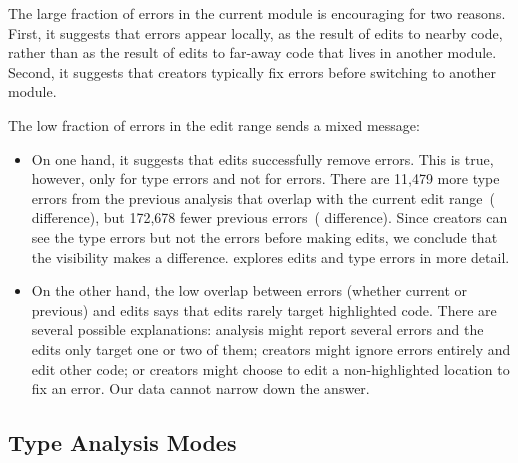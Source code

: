 \documentclass[english,submission,cleveref]{programming}
\begin{document}
The large fraction of errors in the current module is encouraging
for two reasons.
First, it suggests that errors appear locally, as the result of edits to nearby
code, rather than as the result of edits to far-away code that lives in another
module.
Second, it suggests that creators typically fix errors before switching
to another module.

The low fraction of errors in the edit range sends a mixed message:
\begin{itemize}
  \item
    On one hand, it suggests that edits successfully remove errors.
    This is true, however, only for type errors and not for \FS{} errors.
    There are 11,479 more type errors from the previous analysis
    that overlap with the current edit range~( difference),
    but 172,678 fewer previous \FS{} errors~( difference).
    Since creators can see the type errors but not the \FS{}
    errors before making edits, we conclude that the visibility
    makes a difference.
     explores edits and type errors in more detail.

  \item
    On the other hand, the low overlap between errors (whether current or previous)
    and edits says that edits rarely target highlighted code.
    There are several possible explanations:
    analysis might report several errors and the edits only target one or two of them;
    creators might ignore errors entirely and edit other code; or
    creators might choose to edit a non-highlighted location to fix an error.
    Our data cannot narrow down the answer.

\end{itemize}


\subsection{Type Analysis Modes}
\label{s:type-analysis-modes}
\end{document}
